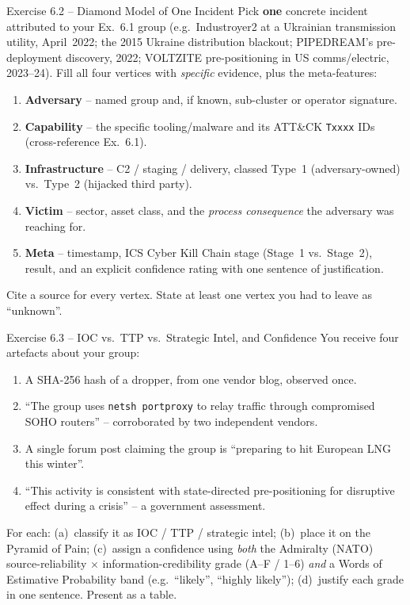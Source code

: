 \documentclass[11pt,a4paper]{article}
\begin{document}
\begin{taskbox}{Exercise 6.2 -- Diamond Model of One Incident}
Pick \textbf{one} concrete incident attributed to your Ex.~6.1 group (e.g.\ Industroyer2 at a
Ukrainian transmission utility, April~2022; the 2015 Ukraine distribution blackout;
PIPEDREAM's pre-deployment discovery, 2022; VOLTZITE pre-positioning in US comms/electric,
2023--24). Fill all four vertices with \emph{specific} evidence, plus the meta-features:
\begin{enumerate}\setlength{\itemsep}{0pt}
  \item \textbf{Adversary} -- named group and, if known, sub-cluster or operator signature.
  \item \textbf{Capability} -- the specific tooling/malware and its ATT\&CK \texttt{Txxxx}
        IDs (cross-reference Ex.~6.1).
  \item \textbf{Infrastructure} -- C2 / staging / delivery, classed Type~1 (adversary-owned)
        vs.\ Type~2 (hijacked third party).
  \item \textbf{Victim} -- sector, asset class, and the \emph{process consequence} the
        adversary was reaching for.
  \item \textbf{Meta} -- timestamp, ICS Cyber Kill Chain stage (Stage~1 vs.\ Stage~2),
        result, and an explicit confidence rating with one sentence of justification.
\end{enumerate}
Cite a source for every vertex. State at least one vertex you had to leave as ``unknown''.
\end{taskbox}

\begin{taskbox}{Exercise 6.3 -- IOC vs.\ TTP vs.\ Strategic Intel, and Confidence}
You receive four artefacts about your group:
\begin{enumerate}\setlength{\itemsep}{0pt}
  \item A SHA-256 hash of a dropper, from one vendor blog, observed once.
  \item ``The group uses \texttt{netsh portproxy} to relay traffic through compromised SOHO
        routers'' -- corroborated by two independent vendors.
  \item A single forum post claiming the group is ``preparing to hit European LNG this
        winter''.
  \item ``This activity is consistent with state-directed pre-positioning for disruptive
        effect during a crisis'' -- a government assessment.
\end{enumerate}
For each: (a)~classify it as IOC / TTP / strategic intel; (b)~place it on the Pyramid of Pain;
(c)~assign a confidence using \emph{both} the Admiralty (NATO) source-reliability $\times$
information-credibility grade (A--F / 1--6) \emph{and} a Words of Estimative Probability band
(e.g.\ ``likely'', ``highly likely''); (d)~justify each grade in one sentence. Present as a
table.
\end{taskbox}
\end{document}
